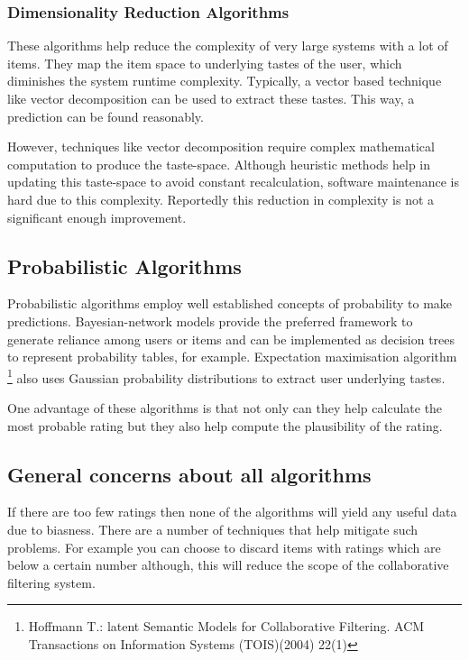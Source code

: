 \subsubsection{Dimensionality Reduction Algorithms}

These algorithms help reduce the complexity of very large systems with a lot of items. They map the item space to underlying tastes of the user, which diminishes the system runtime complexity. Typically, a vector based technique like vector decomposition can be used to extract these tastes. This way, a prediction can be found reasonably.

However, techniques like vector decomposition require complex mathematical computation to produce the taste-space. Although heuristic methods help in updating this taste-space to avoid constant recalculation, software maintenance is hard due to this complexity. Reportedly this reduction in complexity is not a significant enough improvement.

\subsection{Probabilistic Algorithms}

Probabilistic algorithms employ well established concepts of probability to make predictions. Bayesian-network models provide the preferred framework to generate reliance among users or items and can be implemented as decision trees to represent probability tables, for example. 
Expectation maximisation algorithm \footnote{Hoffmann T.: latent Semantic Models for Collaborative Filtering. ACM Transactions on Information Systems (TOIS)(2004) 22(1)} also uses Gaussian probability distributions to extract user underlying tastes.

One advantage of these algorithms is that not only can they help calculate the most probable rating but they also help compute the plausibility of the rating.

\subsection{General concerns about all algorithms}

If there are too few ratings then none of the algorithms will yield any useful data due to biasness. There are a number of techniques that help mitigate such problems. For example you can choose to discard items with ratings which are below a certain number although, this will reduce the scope of the collaborative filtering system.


